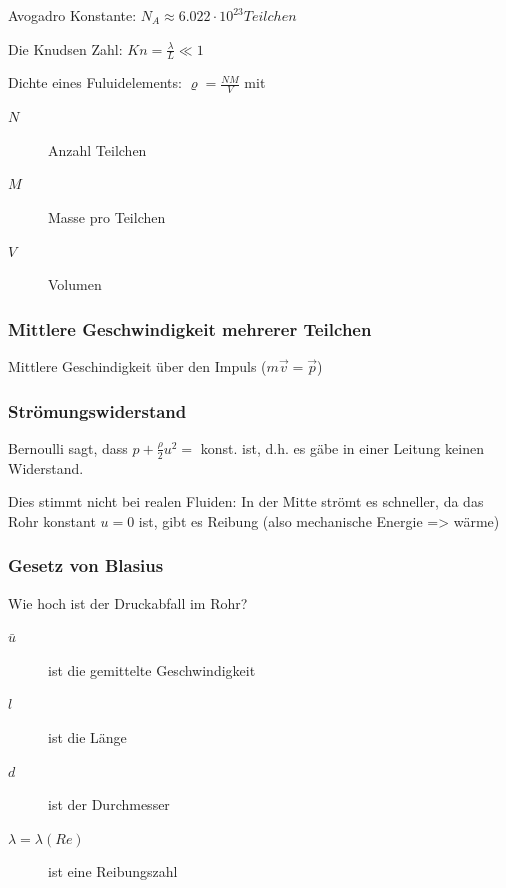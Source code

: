 \documentclass[a4paper]{scrartcl}
\begin{document}









Avogadro Konstante: $N_A \approx 6.022 \cdot 10^23 Teilchen$

Die Knudsen Zahl: $Kn = \frac{\lambda}{L} \ll 1$

Dichte eines Fuluidelements: $\varrho = \frac{NM}{V}$ mit
\begin{description}
	\item[$N$] Anzahl Teilchen
	\item[$M$] Masse pro Teilchen 
	\item[$V$] Volumen
\end{description}

\subsubsection{Mittlere Geschwindigkeit mehrerer Teilchen}
Mittlere Geschindigkeit über den Impuls ($m\vec{v} = \vec{p}$)




\subsubsection{Strömungswiderstand}
	Bernoulli sagt, dass $p + \frac{\rho}{2} u^2 =$ konst. ist, d.h. es gäbe in einer Leitung keinen Widerstand.
	
	Dies stimmt nicht bei realen Fluiden: In der Mitte strömt es schneller, da das Rohr konstant $u=0$ ist, gibt es Reibung (also mechanische Energie => wärme)


\subsubsection{Gesetz von Blasius}
	Wie hoch ist der Druckabfall im Rohr?
	
	\begin{description}
		\item[$\bar{u}$] ist die gemittelte Geschwindigkeit
		\item[$l$] ist die Länge
		\item[$d$] ist der Durchmesser
		\item[$\lambda = \lambda(Re)$] ist eine Reibungszahl %
	\end{description}
	
\end{document}
